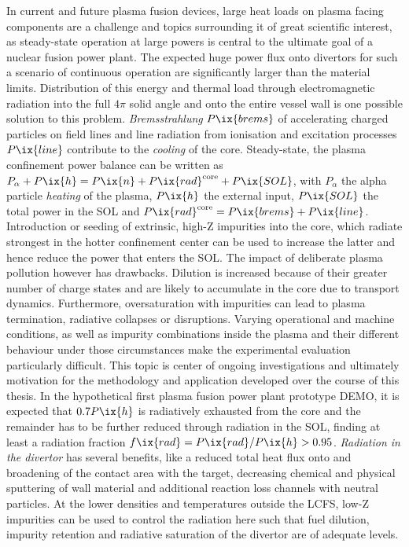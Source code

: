         In current and future plasma fusion devices, large heat loads on plasma facing components are a challenge and topics surrounding it of great scientific interest, as steady-state operation at large powers is central to the ultimate goal of a nuclear fusion power plant. The expected huge power flux onto divertors for such a scenario of continuous operation are significantly larger than the material limits. Distribution of this energy and thermal load through electromagnetic radiation into the full $4\pi$ solid angle and onto the entire vessel wall is one possible solution to this problem. \textit{Bremsstrahlung} $P\ix{brems}$ of accelerating charged particles on field lines and line radiation from ionisation and excitation processes $P\ix{line}$ contribute to the \textit{cooling} of the core. Steady-state, the plasma confinement power balance can be written as $P_{\alpha}+P\ix{h}=P\ix{n}+P\ix{rad}^{\text{core}}+P\ix{SOL}$, with $P_{\alpha}$ the alpha particle \textit{heating} of the plasma, $P\ix{h}$ the external input, $P\ix{SOL}$ the total power in the SOL and $P\ix{rad}^{\text{core}}=P\ix{brems}+P\ix{line}$. Introduction or seeding of extrinsic, high-Z impurities into the core, which radiate strongest in the hotter confinement center can be used to increase the latter and hence reduce the power that enters the SOL\cite{Shubov2021,Schneider2006,Drawin1978}. The impact of deliberate plasma pollution however has drawbacks. Dilution is increased because of their greater number of charge states and are likely to accumulate in the core due to transport dynamics. Furthermore, oversaturation with impurities can lead to plasma termination, radiative collapses or disruptions. Varying operational and machine conditions, as well as impurity combinations inside the plasma and their different behaviour under those circumstances make the experimental evaluation particularly difficult\cite{Reimold2015}. This topic is center of ongoing investigations and ultimately motivation for the methodology and application developed over the course of this thesis. In the hypothetical first plasma fusion power plant prototype DEMO, it is expected that $0.7P\ix{h}$ is radiatively exhausted from the core and the remainder has to be further reduced through radiation in the SOL, finding at least a radiation fraction $f\ix{rad}=P\ix{rad}/P\ix{h}>0.95$. \textit{Radiation in the divertor} has several benefits, like a reduced total heat flux onto and broadening of the contact area with the target, decreasing chemical and physical sputtering of wall material and additional reaction loss channels with neutral particles. At the lower densities and temperatures outside the LCFS, low-Z impurities can be used to control the radiation here such that fuel dilution, impurity retention and radiative saturation of the divertor are of adequate levels\cite{Eich2013,Eich2011,Fuchert2020}.%
%

